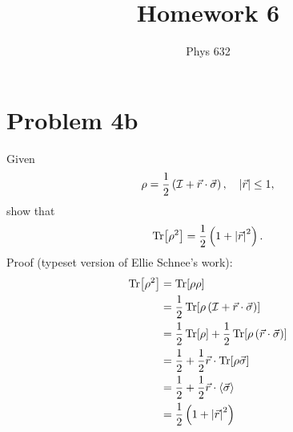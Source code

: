 \documentclass[12pt]{article}
\begin{document}
\title{Homework 6}
\author{Phys 632}
\maketitle

\section*{Problem 4b}
Given
\[ \rho = \frac{1}{2}\left(\mathcal{I} + \vec{r}\cdot\vec{\sigma}\right), \quad \abs{\vec{r}} \leq 1, \]
show that
\[ \Tr[\rho^2] = \frac{1}{2}\left(1 + \abs{\vec{r}}^2\right). \]
Proof (typeset version of Ellie Schnee's work): \\
\begin{align*}
    \Tr[\rho^2] &= \Tr[\rho\rho] \\
    &= \frac{1}{2}\Tr[\rho\left(\mathcal{I} + \vec{r}\cdot\vec{\sigma}\right)] \\
    &= \frac{1}{2}\Tr[\rho] + \frac{1}{2}\Tr[\rho\left(\vec{r}\cdot\vec{\sigma}\right)] \\
    &= \frac{1}{2} + \frac{1}{2}\vec{r}\cdot\Tr[\rho\vec{\sigma}] \\
    &= \frac{1}{2} + \frac{1}{2}\vec{r}\cdot\langle\vec{\sigma}\rangle \\
    &= \frac{1}{2}\left(1 + \abs{\vec{r}}^2\right)
\end{align*}
\end{document}
